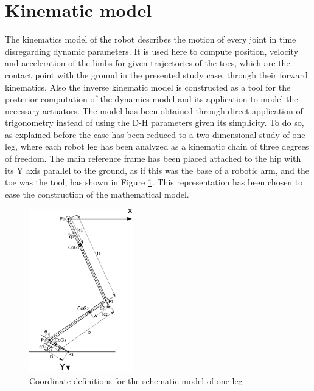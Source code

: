 
\section{Kinematic model}
\label{sec_kinematic_model}
The kinematics model of the robot describes the motion of every joint in time disregarding dynamic parameters.
It is used here to compute position, velocity and acceleration of the limbs for given trajectories of the toes, which are the contact point with the ground in the presented study case, through their forward kinematics.
Also the inverse kinematic model is constructed as a tool for the posterior computation of the dynamics model and its application to model the necessary actuators.
The model has been obtained through direct application of trigonometry instead of using the D-H parameters given its simplicity.
To do so, as explained before the case has been reduced to a two-dimensional study of one leg, where each robot leg has been analyzed as a kinematic chain of three degrees of freedom.
The main reference frame has been placed attached to the hip with its Y axis parallel to the ground, as if this was the base of a robotic arm, and the toe was the tool, has shown in Figure \ref{fig:kinematics}.
This representation has been chosen to ease the construction of the mathematical model.
\begin{figure}[ht]
	\centering
	\includegraphics[width=0.4\textwidth]{figures/kinematics_model.pdf}
	\caption{Coordinate definitions for the schematic model of one leg}
	\label{fig:kinematics}
\end{figure}

